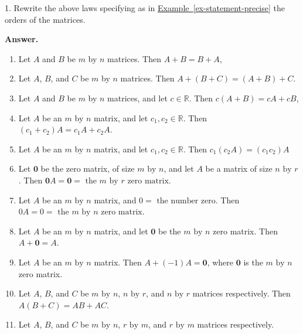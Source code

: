 \documentclass[10pt,]{book}
\theoremstyle{plain}
\theoremstyle{definition}
\theoremstyle{definition}
\theoremstyle{definition}
\theoremstyle{definition}
\begin{document}
\begin{exercisegroup}
\item[1.]\hypertarget{exercise-17}{} Rewrite the above laws specifying as in \hyperref[ex-statement-precise]{Example~\ref{ex-statement-precise}} the orders of the matrices.%
\par\smallskip
\par\smallskip
\noindent\textbf{Answer.}\hypertarget{answer-10}{}\quad
\leavevmode%
\begin{enumerate}[label=\alph*]
\item\hypertarget{li-73}{} Let \(A\) and \(B\) be \(m\) by \(n\) matrices. Then \(A+B=B+A\),%
\item\hypertarget{li-74}{} Let \(A\), \(B\), and \(C\) be \(m\) by \(n\) matrices. Then \(A+(B+C)=(A+B)+C\).%
\item\hypertarget{li-75}{} Let \(A\) and \(B\) be \(m\) by \(n\) matrices, and let \(c\in \mathbb{R}\). Then \(c(A+B)=cA+cB\),%
\item\hypertarget{li-76}{} Let \(A\) be an \(m\) by \(n\) matrix, and let \(c_1,c_2\in \mathbb{R}\). Then \(\left(c_1+c_2\right)A=c_1A+c_2A\).%
\item\hypertarget{li-77}{} Let \(A\) be an \(m\) by \(n\) matrix, and let \(c_1,c_2\in \mathbb{R}\). Then \(c_1\left(c_2A\right)=\left(c_1c_2\right)A\)%
\item\hypertarget{li-78}{} Let \(\pmb{0}\) be the zero matrix, of size \(m \textrm{ by } n\), and let \(A\) be a matrix of size \(n \textrm{ by } r\). Then \(\pmb{0}A=\pmb{0}=\textrm{ the } m \textrm{ by } r \textrm{ zero matrix}\).%
\item\hypertarget{li-79}{} Let \(A\) be an \(m \textrm{ by } n\) matrix, and \(0 = \textrm{ the number zero}\). Then \(0A=0=\textrm{ the } m \textrm{ by } n \textrm{ zero matrix}\).%
\item\hypertarget{li-80}{} Let \(A\) be an \(m \textrm{ by } n\) matrix, and let \(\pmb{0}\) be the \(m \textrm{ by } n\) zero matrix. Then \(A+\pmb{0}=A\). %
\item\hypertarget{li-81}{} Let \(A\) be an \(m \textrm{ by } n\) matrix. Then \(A+(- 1)A=\pmb{0}\), where \(\pmb{0}\) is the \(m \textrm{ by } n\) zero matrix.%
\item\hypertarget{li-82}{} Let \(A\), \(B\), and \(C\) be \(m \textrm{ by } n\), \(n \textrm{ by } r\), and \(n \textrm{ by } r\) matrices respectively. Then \(A(B+C)=AB+AC\).%
\item\hypertarget{li-83}{} Let \(A\), \(B\), and \(C\) be \(m \textrm{ by } n\), \(r \textrm{ by } m\), and \(r \textrm{ by } m\) matrices respectively.

\end{enumerate}
\end{exercisegroup}
\end{document}
